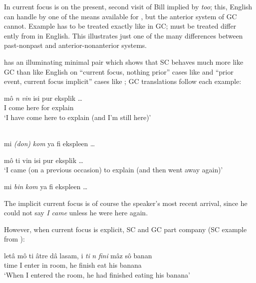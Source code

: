 In  current focus is on the present, second visit of Bill implied by \textit{too}; this, English can handle by one of the means available for , but the anterior system of GC cannot. Example  has to be treated exactly like  in GC;  must be treated differ%
ently from  in English. This illustrates just one of the many differences between past-nonpast and anterior-nonanterior systems.

\citet[107]{Corne1977} has an illuminating minimal pair which shows that SC behaves much more like GC than like English on ``current focus, nothing prior'' cases like  and ``prior event, current focus implicit'' cases like ; GC translations follow each example:

\ea\label{ex:2:106}
\gll mô \emph{n} \emph{vin} isi pur eksplik \ldots\\
I {\COMP} come here for explain\\
\glt `I have come here to explain (and I'm still here)'
\z

\ea\label{ex:2:107}
\langinfo{\langGC}{}{}\\
mi \textit{(don)} \textit{kom} ya fi ekspleen \ldots
\z

\ea\label{ex:2:108}
mô ti vin isi pur eksplik \ldots \\
\glt `I came (on a previous occasion) to explain (and then went away again)'
\z

\ea\label{ex:2:109}
 mi \textit{bin} \textit{kom} ya fi ekspleen \ldots
\glt
\z

\noindent The implicit current focus is of course the speaker's most recent arrival, since he could not say \textit{I came} unless he were here again.

However, when current focus is explicit, SC and GC part company (SC example from \citealt[108]{Corne1977}):

\ea\label{ex:2:110}
\gll letâ mô ti âtre dâ lasam, i \emph{ti} \emph{n} \emph{fini} mâz sô banan\footnotemark \\
time I {\TNS} enter in room, he {\TNS} {\COMP} finish eat his banana\\
\glt `When I entered the room, he had finished eating his banana'
\z
{}


